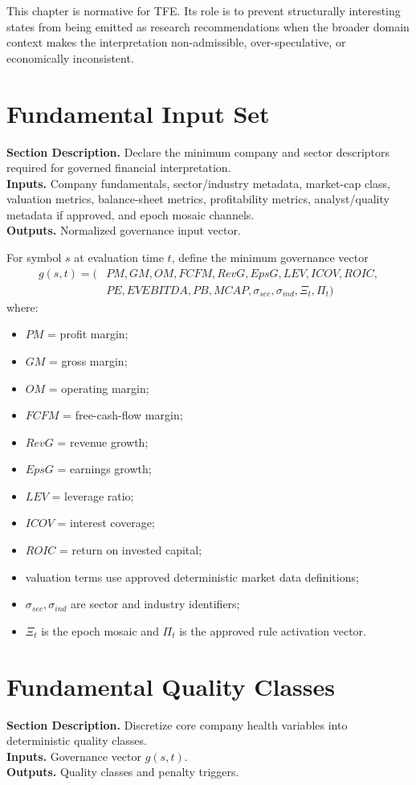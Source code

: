 \documentclass[11pt]{report}
\newcommand{\meta}[3]{\textbf{Section Description.} #1\\
\textbf{Inputs.} #2\\
\textbf{Outputs.} #3\par}
\begin{document}
This chapter is normative for TFE. Its role is to prevent structurally interesting states from being emitted as research recommendations when the broader domain context makes the interpretation non-admissible, over-speculative, or economically inconsistent.

\section{Fundamental Input Set}
\meta{Declare the minimum company and sector descriptors required for governed financial interpretation.}{Company fundamentals, sector/industry metadata, market-cap class, valuation metrics, balance-sheet metrics, profitability metrics, analyst/quality metadata if approved, and epoch mosaic channels.}{Normalized governance input vector.}

For symbol $s$ at evaluation time $t$, define the minimum governance vector
\begin{align*}
g(s,t)=(&PM,GM,OM,FCFM,RevG,EpsG,LEV,ICOV,ROIC,\\
&PE,EVEBITDA,PB,MCAP,\sigma_{sec},\sigma_{ind},\Xi_t,\Pi_t)
\end{align*}
where:
\begin{itemize}
\item $PM$ = profit margin;
\item $GM$ = gross margin;
\item $OM$ = operating margin;
\item $FCFM$ = free-cash-flow margin;
\item $RevG$ = revenue growth;
\item $EpsG$ = earnings growth;
\item $LEV$ = leverage ratio;
\item $ICOV$ = interest coverage;
\item $ROIC$ = return on invested capital;
\item valuation terms use approved deterministic market data definitions;
\item $\sigma_{sec},\sigma_{ind}$ are sector and industry identifiers;
\item $\Xi_t$ is the epoch mosaic and $\Pi_t$ is the approved rule activation vector.
\end{itemize}

\section{Fundamental Quality Classes}
\meta{Discretize core company health variables into deterministic quality classes.}{Governance vector $g(s,t)$.}{Quality classes and penalty triggers.}
\end{document}
